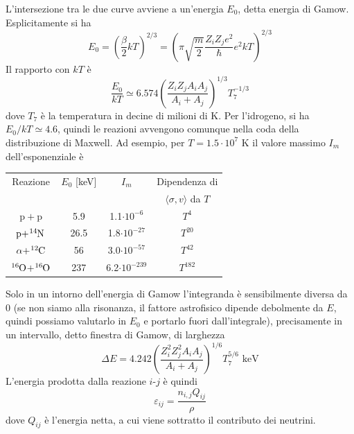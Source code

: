 \documentclass[a4paper,11pt]{article}
\theoremstyle{theorem}
\theoremstyle{definition}
\begin{document}
\begin{itemize}
		L'intersezione tra le due curve avviene a un'energia $E_0$, detta energia di Gamow. Esplicitamente si ha
		\[E_0=\left(\frac{\beta}{2}kT\right)^{2/3}=\left(\pi\sqrt{\frac{m}{2}}\frac{Z_iZ_je^2}{\hbar}e^2kT\right)^{2/3}\] 
		Il rapporto con $kT$ è
		\[\frac{E_0}{kT}\simeq6.574\left(\frac{Z_iZ_jA_iA_j}{A_i+A_j}\right)^{1/3}T_7^{-1/3}\]
		dove $T_7$ è la temperatura in decine di milioni di K. Per l'idrogeno, si ha $E_0/kT\simeq 4.6$, quindi le reazioni avvengono comunque nella coda della distribuzione di Maxwell. Ad esempio, per $T=1.5\cdot10^7$ K il valore massimo $I_m$  dell'esponenziale è
		\begin{center}
		\begin{tabular}{c | c |c|c}
			Reazione&$E_0$ [keV]&$I_m$&Dipendenza di \\&&&$\langle\sigma,v\rangle$ da $T$\\
			\hline\hline
			$\mathrm{p + p}$&5.9&1.1$\cdot10^{-6}$&$T^4$\\
			$\mathrm{p + }\tensor[^{14}]{\mathrm{N}}{}$&26.5&1.8$\cdot10^{-27}$&$T^{20}$\\
			$\alpha\mathrm{ + }\tensor[^{12}]{\mathrm{C}}{}$&56&3.0$\cdot10^{-57}$&$T^{42}$\\
			$\tensor[^{16}]{\mathrm{O}}{}\mathrm{ + }\tensor[^{16}]{\mathrm{O}}{}$&237&6.2$\cdot10^{-239}$&$T^{182}$
		\end{tabular}
		\end{center}
		\noindent Solo in un intorno dell'energia di Gamow l'integranda è sensibilmente diversa da 0 (se non siamo alla risonanza, il fattore astrofisico dipende debolmente da $E$, quindi possiamo valutarlo in $E_0$ e portarlo fuori dall'integrale), precisamente in un intervallo, detto finestra di Gamow, di larghezza
		\[\Delta E=4.242\left(\frac{Z_i^2Z_j^2A_iA_j}{A_i+A_j}\right)^{1/6}T_7^{5/6}\textrm{ keV}\]
		L'energia prodotta dalla reazione $i$-$j$ è quindi
		\[\varepsilon_{ij}=\frac{n_{i,j}Q_{ij}}{\rho}\]
		dove $Q_{ij}$ è l'energia netta, a cui viene sottratto il contributo dei neutrini.
		

\end{itemize}
\end{document}
